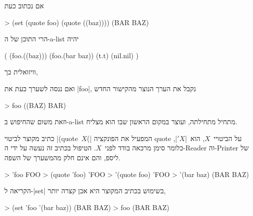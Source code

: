 \minipage\textwidth
אם נכתוב כעת
\begin{LISP}
> (set (quote foo) (quote ((baz))))
(BAR BAZ)
\end{LISP}
הרי התוכן של ה-a-list יהיה
\begin{LISP}
(
  (foo.((baz)))
  (foo.(bar baz))
  (t.t)
  (nil.nil)
)
\end{LISP}
\endminipage

וויזואלית כך,
\begin{LTR}
\end{LTR}

ואם ננסה לשערך כעת את \T|foo|, נקבל את הערך הנוצר מהקישור החדש
\begin{LISP}
> foo
((BAZ) BAR)
\end{LISP}
וזאת משום שהחיפוש ב-a-list מתחיל מתחילתה, ועוצר במקום הראשון שבו הוא מצליח.

כתיב מקוצר לביטוי \E|(quote~$X$(| המפעיל את הפונקציה quote על הביטויי~$X$,
הוא~\E|$'X$|, כלומר סימן מרכאה בודד לפני~$X$. הטיפול בכתיב זה נעשה על ידי
ה-Reader וה-Printer של ליספ, והם אינם חלק מהמשערך של השפה.
\begin{LISP}
> 'foo
FOO
> (quote 'foo)
'FOO
> '(quote foo)
'FOO
> '(bar baz)
(BAR BAZ)
\end{LISP}

הקריאה ל-\E|set| בשימוש בכתיב המקוצר היא אכן קצרה יותר,
\begin{LISP}
> (set 'foo '(bar baz))
(BAR BAZ)
> foo
(BAR BAZ)
\end{LISP}

